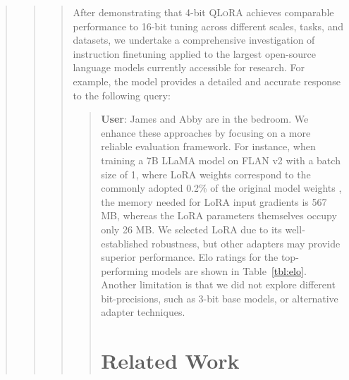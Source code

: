 \begin{quote}
\begin{quote}
\begin{abstract}
{\label{sec:pushing}
After demonstrating that 4-bit \textsc{QLoRA} achieves comparable performance to 16-bit tuning across different scales, tasks, and datasets, we undertake a comprehensive investigation of instruction finetuning applied to the largest open-source language models currently accessible for research. For example, the model provides a detailed and accurate response to the following query:

\begin{quote}
    \textbf{User}: James and Abby are in the bedroom. We enhance these approaches by focusing on a more reliable evaluation framework. For instance, when training a 7B LLaMA model on FLAN v2 with a batch size of 1, where LoRA weights correspond to the commonly adopted 0.2\% of the original model weights \citep{hu2021lora,liu2022few}, the memory needed for LoRA input gradients is 567 MB, whereas the LoRA parameters themselves occupy only 26 MB. We selected LoRA due to its well-established robustness, but other adapters may provide superior performance. Elo ratings for the top-performing models are shown in Table~\ref{tbl:elo}. Another limitation is that we did not explore different bit-precisions, such as 3-bit base models, or alternative adapter techniques. \section{Related Work}


\end{quote}}
\end{abstract}
\end{quote}
\end{quote}

